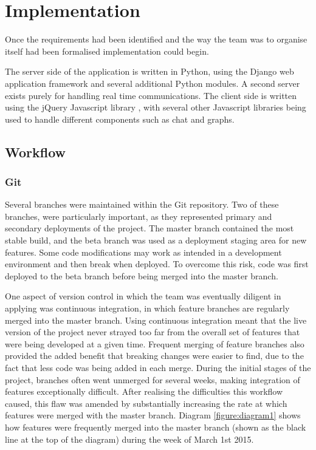\documentclass[a4paper]{l3proj}
\begin{document}
\chapter{Implementation}
\label{impl}

Once the requirements had been identified and the way the team was to organise itself had been formalised implementation could begin. 

The server side of the application is written in Python, using the Django web application framework and several additional Python modules. A second server exists purely for handling real time communications. The client side is written using the jQuery Javascript library \cite{site:jquery}, with several other Javascript libraries being used to handle different components such as chat and graphs. 

\section{Workflow}
\label{workflow}

\subsection{Git}
\label{git}

Several branches were maintained within the Git repository. Two of these branches, were particularly important, as they represented primary and secondary deployments of the project. The master branch contained the most stable build, and the beta branch was used as a deployment staging area for new features. Some code modifications may work as intended in a development environment and then break when deployed. To overcome this risk, code was first deployed to the beta branch before being merged into the master branch.

One aspect of version control in which the team was eventually diligent in applying was continuous integration, in which feature branches are regularly merged into the master branch. Using continuous integration meant that the live version of the project never strayed too far from the overall set of features that were being developed at a given time. Frequent merging of feature branches also provided the added benefit that breaking changes were easier to find, due to the fact that less code was being added in each merge. During the initial stages of the project, branches often went unmerged for several weeks, making integration of features exceptionally difficult. After realising the difficulties this workflow caused, this flaw was amended by substantially increasing the rate at which features were merged with the master branch. Diagram \ref{figure:diagram1} shows how features were frequently merged into the master branch (shown as the black line at the top of the diagram) during the week of March 1st 2015.
\end{document}
